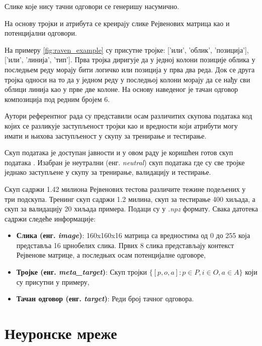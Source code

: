 \documentclass[a4paper, 12pt, master, utf8]{etf}
\begin{document}
Слике које нису тачни одговори се генеришу насумично.
\newline

На основу тројки и атрибута се креирају слике Рејвенових матрица као и потенцијални одговори.
\newline

На примеру \ref{fig:raven_example} су присутне тројке: ['или', 'облик', 'позиција'], ['или', 'линија', 'тип']. Прва тројка диригује да у једној колони позиције облика у последњем реду морају бити логичко или позиција у прва два реда. Док  се друга тројка односи на то да у једном реду у последњој колони морају да се
нађу сви облици линија као у прве две колоне. На основу наведеног је тачан одговор композиција под редним бројем 6.
\newline

Аутори референтног рада су представили осам различитих скупова података код којих се разликује заступљеност тројки као и вредности који атрибути могу имати и њихова заступљеност у скупу за тренирање и тестирање. 
\newline

Скуп података је доступан јавности и у овом раду је коришћен готов скуп података \cite{noauthor_procedurally_2023}.
Изабран је неутрални (енг. \textit{neutral}) скуп података где су све тројке једнако заступљене у скупу за тренирање, валидацију и тестирање. 
\newline

Скуп садржи 1.42 милиона Рејвенових тестова различите тежине подељених у три подскупа. Тренинг скуп садржи 1.2 милина, скуп за тестирање 400 хиљада, а скуп за валидацију 20 хиљада примера. Подаци су у \textit{.npz} формату.
Свака датотека садржи следеће информације:

\begin{itemize}[noitemsep]
    \item \textbf{Слика (енг. \textit{image})}: 160x160x16 матрица са вредностима од 0 до 255 која представља 16 црнобелих слика. Првих 8 слика представљају контекст Рејвенове матрице, а последњих осам потенцијалне одговоре,
    \item \textbf{Тројке (енг. \textit{meta\_target})}: Скуп тројки $\{[p, o, a]: p \in P, i \in O, a \in A\}$ који су присутни у примеру, 
    \item \textbf{Тачан одговор (енг. \textit{target})}: Реди број тачног одговора.
\end{itemize}



\section{Неуронске мреже}
\label{sec:23}
\end{document}
